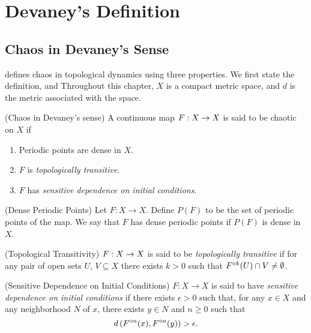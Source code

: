 \documentclass[12pt,draft,twoside]{book}
\begin{document}
\chapter{Devaney's Definition}
\label{chap:devaney}
\section{Chaos in Devaney's Sense}
\citet{devaney} defines chaos in topological dynamics using three properties.
We first state the definition, and 
Throughout this chapter, $X$ is a compact metric space, and $d$ is the metric associated with the space.
\begin{definition}
  (Chaos in Devaney's sense) 
  A continuous map $F: X\rightarrow X$ is said to be chaotic on $X$ if
  \begin{enumerate}
    \item Periodic points are dense in $X$.
    \item $F$ is \textit{topologically transitive}.
    \item $F$ has \textit{sensitive dependence on initial conditions}.
  \end{enumerate}
\end{definition}
%
\begin{definition}
  (Dense Periodic Points) 
  Let $F: X \to X$.
  Define $P(F)$ to be the set of periodic points of the map.
  We say that $F$ has dense periodic points if $P(F)$ is dense in $X$.
\end{definition}
%
\begin{definition}
  (Topological Transitivity) 
  $F: X \rightarrow X$ is said to be \textit{topologically transitive} if for any pair of open sets $U$, $V \subseteq X$ there exists $k > 0$ such that $F^{\circ k}(U) \cap V \neq \emptyset$.
  \label{defn:transitivity}
\end{definition}
%
\begin{definition}
  (Sensitive Dependence on Initial Conditions) 
  $F: X \rightarrow X$ is said to have \textit{sensitive dependence on initial conditions} if there exists $\epsilon > 0$ such that, for any $x \in X$ and any neighborhood $N$ of $x$, there exists $y\in N$ and $n\geq 0$ such that 
  \begin{equation*}
    d\left( F^{\circ n}(x), F^{\circ n}(y) \right) > \epsilon.
  \end{equation*}
  \label{defn:sdic}
\end{definition}
\end{document}
